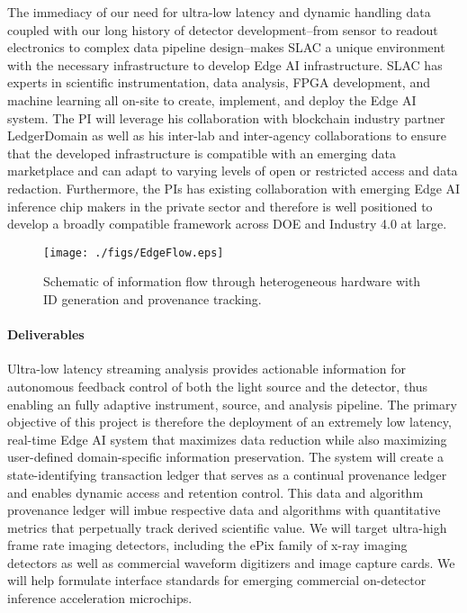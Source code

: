 \documentclass{article}
\begin{document}
The immediacy of our need for ultra-low latency and dynamic handling data coupled with our long history of detector development--from sensor to readout electronics to complex data pipeline design--makes SLAC a unique environment with the necessary infrastructure to develop Edge AI infrastructure.
SLAC has experts in scientific instrumentation, data analysis, FPGA development, and machine learning all on-site to create, implement, and deploy the Edge AI system.
The PI will leverage his collaboration with blockchain industry partner LedgerDomain \cite{LedgerDomain,BruinChain} as well as his inter-lab and inter-agency collaborations to ensure that the developed infrastructure is compatible with an emerging data marketplace and can adapt to varying levels of open or restricted access and data redaction.
Furthermore, the PIs has existing collaboration with emerging Edge AI inference chip makers in the private sector and therefore is well positioned to develop a broadly compatible framework across DOE and Industry 4.0 at large.

\begin{figure}
	\vspace{-1\baselineskip}
	\centerline{\texttt{[image: ./figs/EdgeFlow.eps]}}
	\vspace{-1\baselineskip}
	\caption{
		\label{fig::EdgeFlow}
		Schematic of information flow through heterogeneous hardware with ID generation and provenance tracking.
		}
	\vspace{-1\baselineskip}
\end{figure}

\paragraph{Deliverables}
Ultra-low latency streaming analysis provides actionable information for autonomous feedback control of both the light source and the detector, thus enabling an fully adaptive instrument, source, and analysis pipeline.
The primary objective of this project is therefore the deployment of an extremely low latency, real-time Edge AI system that maximizes data reduction while also maximizing user-defined domain-specific information preservation. 
The system will create a state-identifying transaction ledger that serves as a continual provenance ledger and enables dynamic access and retention control.
This data and algorithm provenance ledger will imbue respective data and algorithms with quantitative metrics that perpetually track derived scientific value.
We will target ultra-high frame rate imaging detectors, including the ePix family of x-ray imaging detectors as well as commercial waveform digitizers and image capture cards.
We will help formulate interface standards for emerging commercial on-detector inference acceleration microchips.
\end{document}
